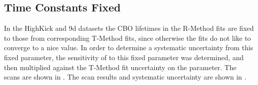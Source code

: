 \clearpage
\subsection{Time Constants Fixed}

In the HighKick and 9d datasets the CBO lifetimes in the R-Method fits are fixed to those from corresponding T-Method fits, since otherwise the fits do not like to converge to a nice value. In order to determine a systematic uncertainty from this fixed parameter, the sensitivity of \R to this fixed parameter was determined, and then multiplied against the T-Method fit uncertainty on the parameter. The scans are shown in . The scan results and systematic uncertainty are shown in .



